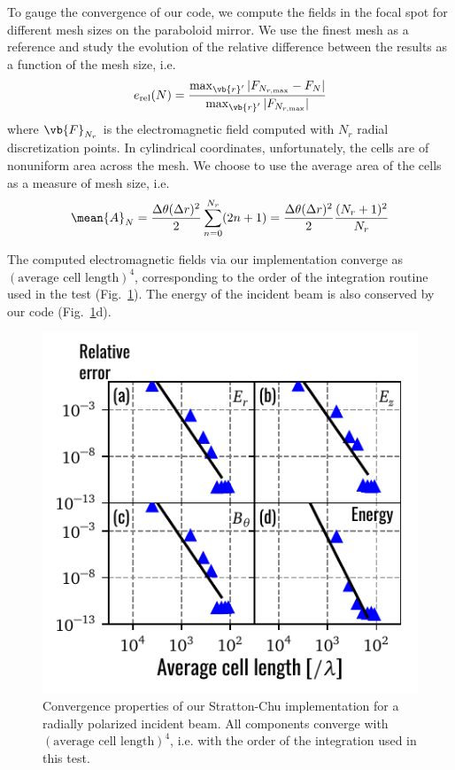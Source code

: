 \documentclass[11pt,SymmetricalJury]{inrsthesis/inrsthesis}
\begin{document}
To gauge the convergence of our code, we compute the fields in the focal spot
for different mesh sizes on the paraboloid mirror. We use the finest mesh
as a reference and study the evolution of the relative difference between
the results as a function of the mesh size, i.e.
  \begin{equation}
    e_\text{rel}(N) = \frac{\max_{\vb{r}'}|F_{N_{r,\text{max}}}-F_{N}|}
                            {\max_{\vb{r}'}|F_{N_{r,\text{max}}}|}
  \end{equation}
where $\vb{F}_{N_r}$ is the electromagnetic field computed with $N_r$
radial discretization points. In cylindrical coordinates, unfortunately,
the cells are of nonuniform area across the mesh. We choose to use the average
area of the cells as a measure of mesh size, i.e.
  \begin{equation}
    \mean{A}_N = \frac{\Delta\theta(\Delta r)^2}{2}\sum_{n=0}^{N_r} (2n+1)
               = \frac{\Delta\theta(\Delta r)^2}{2}\frac{(N_r+1)^2}{N_r}
  \end{equation}

The computed electromagnetic fields via our implementation converge as
$(\text{average cell length})^4$, corresponding to the order of the
integration routine used in the test (Fig.~\ref{fig:sc.convergence-radial}).
The energy of the incident beam is also conserved by our code (Fig.~\ref{fig:sc.convergence-radial}d).

\begin{figure}
  \centering
  \includegraphics{figs/ConvergenceAll.pdf}
  \caption[Convergence pro
  perties of our Stratton-Chu implementation (radial polarization).]
  {Convergence properties of our Stratton-Chu implementation for a radially polarized
  incident beam. All components converge with $(\text{average cell length})^4$,
  i.e. with the order of the integration used in this test.}
  \label{fig:sc.convergence-radial}
\end{figure}
\end{document}
